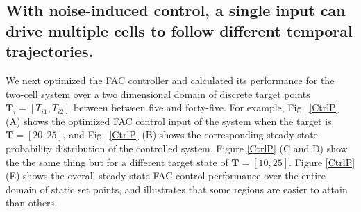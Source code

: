\documentclass[12pt]{iopart}
\begin{document}
\subsection{With noise-induced control, a single input can drive multiple cells to follow different temporal trajectories.}\label{sec:ResTraj}

We next optimized the FAC controller and calculated its performance for the two-cell system over a two dimensional domain of discrete target points $\mathbf{T}_i = [T_{i1},T_{i2}]$ between between five and forty-five. For example, Fig.\ \ref{CtrlP} (A) shows the optimized FAC control input of the system when the target is $\mathbf{T}=[20,25]$, and Fig.\ \ref{CtrlP} (B) shows the corresponding steady state probability distribution of the controlled system. Figure \ref{CtrlP} (C and D) show the the same thing but for a different target state of $\mathbf{T}=[10, 25]$.
Figure \ref{CtrlP}(E) shows the overall steady state FAC control performance over the entire domain of static set points, and illustrates that some regions are easier to attain than others. 
\end{document}
